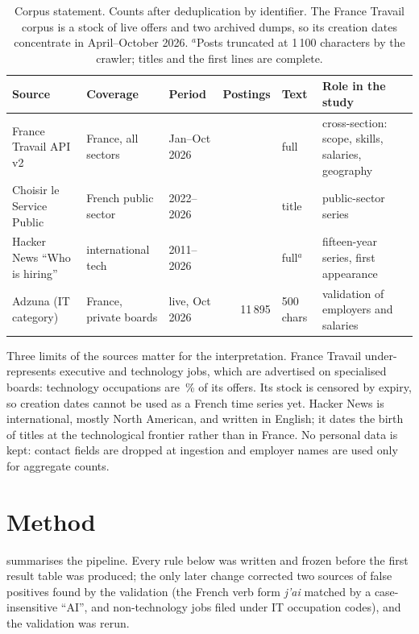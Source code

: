 \documentclass[5p,times,twocolumn,authoryear]{elsarticle}
\begin{document}
\begin{table}[t]
\centering\footnotesize
\caption{Corpus statement. Counts after deduplication by identifier. The France Travail corpus is a stock of live offers and two archived dumps, so its creation dates concentrate in April--October 2026. $^{a}$Posts truncated at 1\,100 characters by the crawler; titles and the first lines are complete.}\label{tab:corpus}
\begin{tabularx}{\textwidth}{@{}lllrlX@{}}
\toprule
Source & Coverage & Period & Postings & Text & Role in the study\\
\midrule
France Travail API v2 & France, all sectors & Jan--Oct 2026 & \nFT{} & full & cross-section: scope, skills, salaries, geography\\
Choisir le Service Public & French public sector & 2022--2026 & \nCSP{} & title & public-sector series\\
Hacker News ``Who is hiring'' & international tech & 2011--2026 & \nHN{} & full$^{a}$ & fifteen-year series, first appearance\\
Adzuna (IT category) & France, private boards & live, Oct 2026 & 11\,895 & 500 chars & validation of employers and salaries\\
\bottomrule
\end{tabularx}
\end{table}

Three limits of the sources matter for the interpretation. France Travail under-represents executive and technology jobs, which are advertised on specialised boards: technology occupations are \pTech\,\% of its offers. Its stock is censored by expiry, so creation dates cannot be used as a French time series yet. Hacker News is international, mostly North American, and written in English; it dates the birth of titles at the technological frontier rather than in France. No personal data is kept: contact fields are dropped at ingestion and employer names are used only for aggregate counts.

\section{Method}\label{sec:method}
 summarises the pipeline. Every rule below was written and frozen before the first result table was produced; the only later change corrected two sources of false positives found by the validation (the French verb form \emph{j'ai} matched by a case-insensitive ``AI'', and non-technology jobs filed under IT occupation codes), and the validation was rerun.
\end{document}
